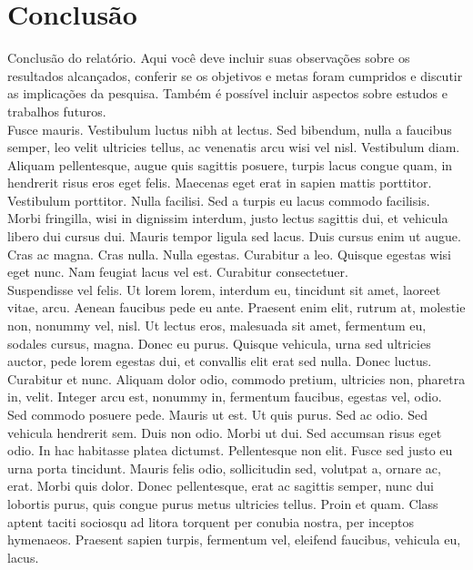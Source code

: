 \section{Conclusão}

Conclusão do relatório. Aqui você deve incluir suas observações sobre os resultados
alcançados, conferir se os objetivos e metas foram cumpridos e discutir as implicações da
pesquisa. Também é possível incluir aspectos sobre estudos e trabalhos futuros. \\

Fusce mauris. Vestibulum luctus nibh at lectus. Sed bibendum, nulla a faucibus semper, leo
velit ultricies tellus, ac venenatis arcu wisi vel nisl. Vestibulum diam. Aliquam pellentesque,
augue quis sagittis posuere, turpis lacus congue quam, in hendrerit risus eros eget felis.
Maecenas eget erat in sapien mattis porttitor. Vestibulum porttitor. Nulla facilisi. Sed a
turpis eu lacus commodo facilisis. Morbi fringilla, wisi in dignissim interdum, justo lectus
sagittis dui, et vehicula libero dui cursus dui. Mauris tempor ligula sed lacus. Duis cursus
enim ut augue. Cras ac magna. Cras nulla. Nulla egestas. Curabitur a leo. Quisque egestas
wisi eget nunc. Nam feugiat lacus vel est. Curabitur consectetuer. \\

Suspendisse vel felis. Ut lorem lorem, interdum eu, tincidunt sit amet, laoreet vitae, arcu.
Aenean faucibus pede eu ante. Praesent enim elit, rutrum at, molestie non, nonummy vel,
nisl. Ut lectus eros, malesuada sit amet, fermentum eu, sodales cursus, magna. Donec eu
purus. Quisque vehicula, urna sed ultricies auctor, pede lorem egestas dui, et convallis elit
erat sed nulla. Donec luctus. Curabitur et nunc. Aliquam dolor odio, commodo pretium,
ultricies non, pharetra in, velit. Integer arcu est, nonummy in, fermentum faucibus, egestas
vel, odio. \\

Sed commodo posuere pede. Mauris ut est. Ut quis purus. Sed ac odio. Sed vehicula
hendrerit sem. Duis non odio. Morbi ut dui. Sed accumsan risus eget odio. In hac habitasse
platea dictumst. Pellentesque non elit. Fusce sed justo eu urna porta tincidunt. Mauris felis
odio, sollicitudin sed, volutpat a, ornare ac, erat. Morbi quis dolor. Donec pellentesque,
erat ac sagittis semper, nunc dui lobortis purus, quis congue purus metus ultricies tellus.
Proin et quam. Class aptent taciti sociosqu ad litora torquent per conubia nostra, per
inceptos hymenaeos. Praesent sapien turpis, fermentum vel, eleifend faucibus, vehicula eu,
lacus. \\
